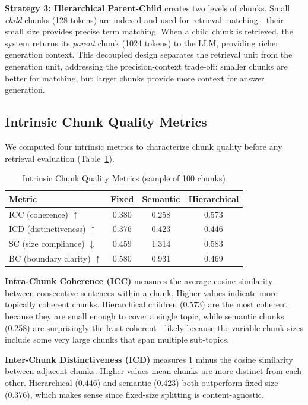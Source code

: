 \documentclass[conference]{IEEEtran}
\begin{document}
\textbf{Strategy 3: Hierarchical Parent-Child} creates two levels of chunks. Small \textit{child} chunks (128 tokens) are indexed and used for retrieval matching---their small size provides precise term matching. When a child chunk is retrieved, the system returns its \textit{parent} chunk (1024 tokens) to the LLM, providing richer generation context. This decoupled design separates the retrieval unit from the generation unit, addressing the precision-context trade-off: smaller chunks are better for matching, but larger chunks provide more context for answer generation.

\subsection{Intrinsic Chunk Quality Metrics}

We computed four intrinsic metrics to characterize chunk quality before any retrieval evaluation (Table~\ref{tab:intrinsic}).

\begin{table}[htbp]
\caption{Intrinsic Chunk Quality Metrics (sample of 100 chunks)}
\begin{center}
\begin{tabular}{lccc}
\toprule
\textbf{Metric} & \textbf{Fixed} & \textbf{Semantic} & \textbf{Hierarchical} \\
\midrule
ICC (coherence) $\uparrow$ & 0.380 & 0.258 & 0.573 \\
ICD (distinctiveness) $\uparrow$ & 0.376 & 0.423 & 0.446 \\
SC (size compliance) $\downarrow$ & 0.459 & 1.314 & 0.583 \\
BC (boundary clarity) $\uparrow$ & 0.580 & 0.931 & 0.469 \\
\bottomrule
\end{tabular}
\label{tab:intrinsic}
\end{center}
\end{table}

\textbf{Intra-Chunk Coherence (ICC)} measures the average cosine similarity between consecutive sentences within a chunk. Higher values indicate more topically coherent chunks. Hierarchical children (0.573) are the most coherent because they are small enough to cover a single topic, while semantic chunks (0.258) are surprisingly the least coherent---likely because the variable chunk sizes include some very large chunks that span multiple sub-topics.

\textbf{Inter-Chunk Distinctiveness (ICD)} measures 1 minus the cosine similarity between adjacent chunks. Higher values mean chunks are more distinct from each other. Hierarchical (0.446) and semantic (0.423) both outperform fixed-size (0.376), which makes sense since fixed-size splitting is content-agnostic.
\end{document}
